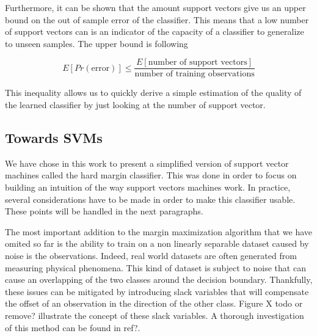 Furthermore, it can be shown that the amount support vectors give us an upper bound on the out of sample error of the classifier. This means that a low number of support vectors can is an indicator of the capacity of a classifier to generalize to unseen samples. The upper bound is following

\begin{equation}
  E\left[Pr\left(\text{error}\right)\right] \leq \frac{E\left[\text{number of support vectors}\right]}{\text{number of training observations}}
\end{equation}

This inequality allows us to quickly derive a simple estimation of the quality of the learned classifier by just looking at the number of support vector.

\subsection{Towards SVMs}

We have chose in this work to present a simplified version of support vector machines called the hard margin classifier. This was done in order to focus on building an intuition of the way support vectors machines work. In practice, several considerations have to be made in order to make this classifier usable. These points will be handled in the next paragraphs.

The most important addition to the margin maximization algorithm that we have omited so far is the ability to train on a non linearly separable dataset caused by noise is the observations. Indeed, real world datasets are often generated from measuring physical phenomena. This kind of dataset is subject to noise that can cause an overlapping of the two classes around the decision boundary. Thankfully, these issues can be mitigated by introducing slack variables that will compensate the offset of an observation in the direction of the other class. Figure X  \textcolor[rgb]{1,0,0}{todo or remove?} illustrate the concept of these slack variables. A thorough investigation of this method can be found in \textcolor[rgb]{1,0,0}{ref?}.


